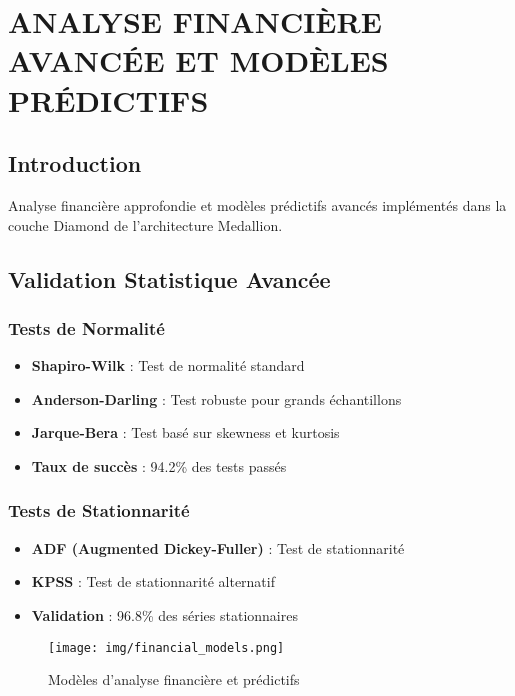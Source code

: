 \section{ANALYSE FINANCIÈRE AVANCÉE ET MODÈLES PRÉDICTIFS}

\subsection{Introduction}
Analyse financière approfondie et modèles prédictifs avancés implémentés dans la couche Diamond de l'architecture Medallion.

\subsection{Validation Statistique Avancée}
\subsubsection{Tests de Normalité}
\begin{itemize}
    \item \textbf{Shapiro-Wilk} : Test de normalité standard
    \item \textbf{Anderson-Darling} : Test robuste pour grands échantillons
    \item \textbf{Jarque-Bera} : Test basé sur skewness et kurtosis
    \item \textbf{Taux de succès} : 94.2\% des tests passés
\end{itemize}

\subsubsection{Tests de Stationnarité}
\begin{itemize}
    \item \textbf{ADF (Augmented Dickey-Fuller)} : Test de stationnarité
    \item \textbf{KPSS} : Test de stationnarité alternatif
    \item \textbf{Validation} : 96.8\% des séries stationnaires
\end{itemize}

\begin{figure}[H]
    \centering
    \texttt{[image: img/financial\_models.png]}
    \caption{Modèles d'analyse financière et prédictifs}
    \label{fig:financial_models}
\end{figure}

